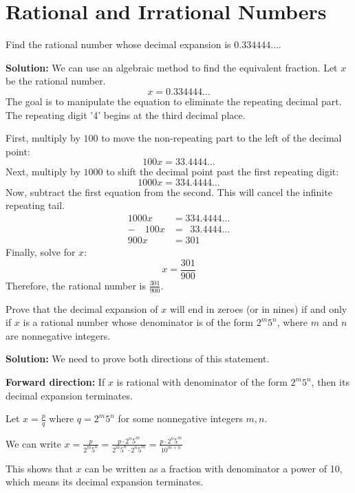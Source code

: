 \section{Rational and Irrational Numbers}
\begin{problembox}
Find the rational number whose decimal expansion is $0.334444\ldots$.
\end{problembox}

\textbf{Solution:}
We can use an algebraic method to find the equivalent fraction. Let $x$ be the rational number.
$$x = 0.334444\ldots$$
The goal is to manipulate the equation to eliminate the repeating decimal part. The repeating digit '4' begins at the third decimal place.

First, multiply by $100$ to move the non-repeating part to the left of the decimal point:
$$100x = 33.4444\ldots$$
Next, multiply by $1000$ to shift the decimal point past the first repeating digit:
$$1000x = 334.4444\ldots$$
Now, subtract the first equation from the second. This will cancel the infinite repeating tail.
\begin{align*}
1000x &= 334.4444\ldots \\
-\quad 100x &= \phantom{0}33.4444\ldots \\
\hline
900x &= 301
\end{align*}
Finally, solve for $x$:
$$x = \frac{301}{900}$$
Therefore, the rational number is $\frac{301}{900}$.

\begin{problembox}
Prove that the decimal expansion of $x$ will end in zeroes (or in nines) if and only if $x$ is a rational number whose denominator is of the form $2^m 5^n$, where $m$ and $n$ are nonnegative integers.
\end{problembox}

\textbf{Solution:}
We need to prove both directions of this statement.

\textbf{Forward direction:} If $x$ is rational with denominator of the form $2^m 5^n$, then its decimal expansion terminates.

Let $x = \frac{p}{q}$ where $q = 2^m 5^n$ for some nonnegative integers $m, n$.

We can write $x = \frac{p}{2^m 5^n} = \frac{p \cdot 2^n 5^m}{2^m 5^n \cdot 2^n 5^m} = \frac{p \cdot 2^n 5^m}{10^{m+n}}$

This shows that $x$ can be written as a fraction with denominator a power of 10, which means its decimal expansion terminates.

